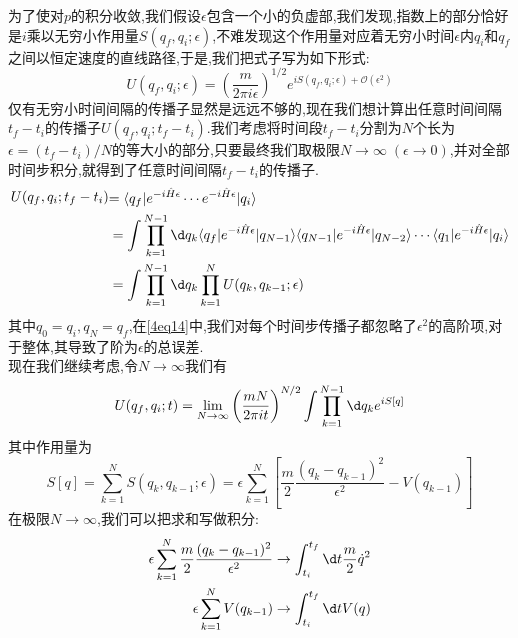 为了使对$ p $的积分收敛,我们假设$\epsilon$包含一个小的负虚部,我们发现,指数上的部分恰好是$ i $乘以无穷小作用量$S(q_f,q_i;\epsilon)$,不难发现这个作用量对应着无穷小时间$\epsilon$内$ q_i $和$ q_f $之间以恒定速度的直线路径,于是,我们把式子写为如下形式:
\begin{equation}\label{4eq14}
    U(q_f,q_i;\epsilon)=\left(\frac{m}{2\pi i\epsilon}\right)^{1/2}e^{iS(q_f,q_i;\epsilon)+\mathcal{O}(\epsilon^2)}
\end{equation}
仅有无穷小时间间隔的传播子显然是远远不够的,现在我们想计算出任意时间间隔$t_f-t_i$的传播子$U(q_f,q_i;t_f-t_i)$.我们考虑将时间段$t_f-t_i$分割为$ N $个长为$\epsilon=(t_f-t_i)/N$的等大小的部分,只要最终我们取极限$N\to\infty\;(\epsilon\to0)$,并对全部时间步积分,就得到了任意时间间隔$t_f-t_i$的传播子.
\begin{equation}
    \begin{aligned}
        \begin{aligned}U(q_f,q_i;t_f-t_i)\end{aligned}& \begin{aligned}=\langle q_{f}|e^{-i\hat{H}\epsilon}\cdots e^{-i\hat{H}\epsilon}|q_{i}\rangle\end{aligned} \\
        &=\int\prod_{k=1}^{N-1}\d q_k\langle q_f|e^{-i\hat{H}\epsilon}|q_{N-1}\rangle\langle q_{N-1}|e^{-i\hat{H}\epsilon}|q_{N-2}\rangle\cdots\langle q_1|e^{-i\hat{H}\epsilon}|q_i\rangle \\
        &=\int\prod_{k=1}^{N-1}\d q_k\prod_{k=1}^NU(q_k,q_{k-1};\epsilon)
    \end{aligned}
\end{equation}
其中$q_0=q_i,q_N=q_f$,在\ref{4eq14}中,我们对每个时间步传播子都忽略了$\epsilon^2$的高阶项,对于整体,其导致了阶为$\epsilon$的总误差. \\
现在我们继续考虑,令$N\to\infty$我们有
\begin{equation}
    U(q_f,q_i;t)=\lim_{N\to\infty}\left(\frac{mN}{2\pi it}\right)^{N/2}\int\prod_{k=1}^{N-1}\d q_k e^{iS[q]}
\end{equation}
其中作用量为
\begin{equation}
    S[q]=\sum_{k=1}^NS(q_k,q_{k-1};\epsilon)=\epsilon\sum_{k=1}^N\left[\frac m2\frac{(q_k-q_{k-1})^2}{\epsilon^2}-V(q_{k-1})\right]
\end{equation}
在极限$N\to\infty$,我们可以把求和写做积分:
\begin{equation}
    \begin{aligned}\epsilon\sum_{k=1}^N\frac{m}{2}\frac{(q_k-q_{k-1})^2}{\epsilon^2}&\to\int_{t_i}^{t_f} \d t\frac{m}{2}\dot{q}^2\\\epsilon\sum_{k=1}^NV(q_{k-1})&\to\int_{t_i}^{t_f} \d t V(q)\end{aligned}
\end{equation}
